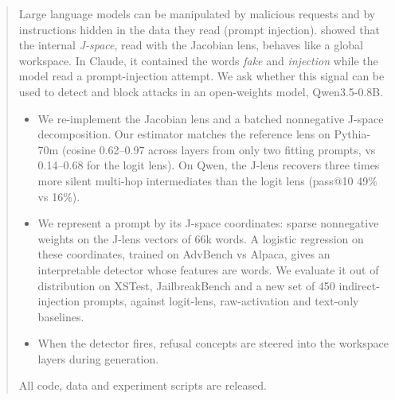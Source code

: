 \begin{abstract}
Large language models can be manipulated by malicious requests and by instructions hidden in
the data they read (prompt injection). \citet{gurnee2026workspace} showed that the internal
\emph{J-space}, read with the Jacobian lens, behaves like a global workspace. In Claude, it
contained the words \textit{fake} and \textit{injection} while the model read a
prompt-injection attempt. We ask whether this signal can be used to detect and block attacks
in an open-weights model, Qwen3.5-0.8B.
\begin{itemize}
  \item We re-implement the Jacobian lens and a batched nonnegative J-space decomposition.
        Our estimator matches the reference lens on Pythia-70m (cosine 0.62--0.97 across
        layers from only two fitting prompts, vs 0.14--0.68 for the logit lens). On Qwen, the
        J-lens recovers three times more silent multi-hop intermediates than the logit lens
        (pass@10 49\% vs 16\%).
  \item We represent a prompt by its J-space coordinates: sparse nonnegative weights on the
        J-lens vectors of 66k words. A logistic regression on these coordinates, trained on
        AdvBench vs Alpaca, gives an interpretable detector whose features are words. We
        evaluate it out of distribution on XSTest, JailbreakBench and a new set of 450
        indirect-injection prompts, against logit-lens, raw-activation and text-only
        baselines.
  \item When the detector fires, refusal concepts are steered into the workspace layers
        during generation.
\end{itemize}
All code, data and experiment scripts are released.
\end{abstract}

